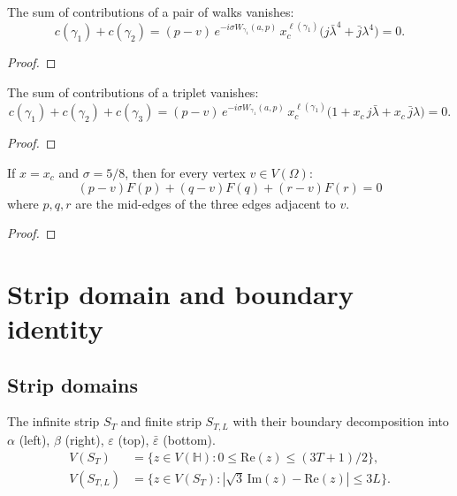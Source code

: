 \begin{theorem}\label{thm:pair_contrib}
\leanok
{}
  The sum of contributions of a pair of walks vanishes:
  \[c(\gamma_1) + c(\gamma_2)
    = (p-v)\, e^{-i\sigma W_{\gamma_1}(a,p)}\, x_c^{\ell(\gamma_1)}
      \bigl(j\bar{\lambda}^4 + \bar{j}\lambda^4\bigr) = 0.\]
\end{theorem}
\begin{proof}
\leanok
\end{proof}

\begin{theorem}\label{thm:triplet_contrib}
\leanok
{}
  The sum of contributions of a triplet vanishes:
  \[c(\gamma_1) + c(\gamma_2) + c(\gamma_3)
    = (p-v)\, e^{-i\sigma W_{\gamma_1}(a,p)}\, x_c^{\ell(\gamma_1)}
      \bigl(1 + x_c\, j\bar{\lambda} + x_c\, \bar{j}\lambda\bigr) = 0.\]
\end{theorem}
\begin{proof}
\leanok
\end{proof}

\begin{theorem}\label{thm:vertex_relation}
\leanok
{}
  If $x = x_c$ and $\sigma = 5/8$, then for every vertex $v \in V(\Omega)$:
  \[ (p-v)F(p) + (q-v)F(q) + (r-v)F(r) = 0 \]
  where $p, q, r$ are the mid-edges of the three edges adjacent to $v$.
\end{theorem}
\begin{proof}
\leanok
\end{proof}


\chapter{Strip domain and boundary identity}\label{chap:strip}

\section{Strip domains}

\begin{definition}\label{def:strip}
\leanok
{}
  The infinite strip $S_T$ and finite strip $S_{T,L}$ with their boundary
  decomposition into $\alpha$ (left), $\beta$ (right), $\varepsilon$ (top),
  $\bar{\varepsilon}$ (bottom).
  \begin{align*}
    V(S_T) &= \{z \in V(\mathbb{H}) : 0 \leq \mathrm{Re}(z) \leq (3T+1)/2\}, \\
    V(S_{T,L}) &= \{z \in V(S_T) : |\sqrt{3}\,\mathrm{Im}(z) - \mathrm{Re}(z)| \leq 3L\}.
  \end{align*}
\end{definition}

